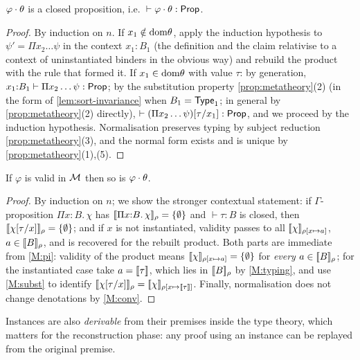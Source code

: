 \begin{lemma}
\label{lem:inst-typed}
$\varphi \cdot \theta$ is a closed proposition, i.e.\
$\vdash \varphi \cdot \theta : \mathsf{Prop}$.
\end{lemma}

\begin{proof}
By induction on $n$.  If $x_1 \notin \mathrm{dom}\theta$, apply the
induction hypothesis to $\psi' = \Pi x_2 \ldots \psi$ in the context
$x_1{:}B_1$ (the definition and the claim relativise to a context of
uninstantiated binders in the obvious way) and rebuild the product
with the rule that formed it.  If $x_1 \in \mathrm{dom}\theta$ with value
$\tau$: by generation, $x_1{:}B_1 \vdash \Pi x_2 \ldots \psi :
\mathsf{Prop}$; by the substitution property \cref{prop:metatheory}(2)
(in the form of \cref{lem:sort-invariance} when $B_1 = \mathsf{Type}_1$;
in general by \cref{prop:metatheory}(2) directly), $\vdash (\Pi x_2
\ldots \psi)[\tau/x_1] : \mathsf{Prop}$, and we proceed by the induction
hypothesis.  Normalisation preserves typing by subject reduction
\cref{prop:metatheory}(3), and the normal form exists and is unique
by \cref{prop:metatheory}(1),(5).
\end{proof}

\begin{lemma}
\label{lem:inst-valid}
If $\varphi$ is valid in $\mathcal{M}$ then so is $\varphi \cdot \theta$.
\end{lemma}

\begin{proof}
By induction on $n$; we show the stronger contextual statement: if
$\Gamma$-proposition $\Pi x{:}B.\,\chi$ has
$[\![ \Pi x{:}B.\,\chi ]\!]_{\rho} = \{\emptyset\}$ and $\vdash \tau : B$ is
closed, then $[\![ \chi[\tau/x] ]\!]_{\rho} = \{\emptyset\}$; and if $x$ is not
instantiated, validity passes to all $[\![ \chi ]\!]_{\rho[x \mapsto
a]}$, $a \in [\![ B ]\!]_{\rho}$, and is recovered for the rebuilt
product.  Both parts are immediate from \ref{M:pi}: validity of the
product means $[\![ \chi ]\!]_{\rho[x \mapsto a]} = \{\emptyset\}$ for
\emph{every} $a \in [\![ B ]\!]_{\rho}$; for the instantiated case take
$a = [\![ \tau ]\!]$, which lies in $[\![ B ]\!]_{\rho}$ by \ref{M:typing},
and use \ref{M:subst} to identify
$[\![ \chi[\tau/x] ]\!]_{\rho} = [\![ \chi ]\!]_{\rho[x \mapsto
[\![ \tau ]\!]]}$.  Finally, normalisation does not change denotations
by \ref{M:conv}.
\end{proof}

Instances are also \emph{derivable} from their premises inside the
type theory, which matters for the reconstruction phase: any proof
using an instance can be replayed from the original premise.

